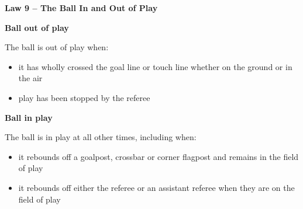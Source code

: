 \clearpage
\sffamily
{\bfseries\color[rgb]{0.4,0.4,0.4}
Law 9 -- The Ball In and Out of Play}
{}

\bigskip

{\bfseries Ball out of play}

\headlinebox

The ball is out of play when:

\begin{itemize}
\item it has wholly crossed the goal line or touch line whether on the ground or in the air
\item play has been stopped by the referee
\end{itemize}

{\bfseries Ball in play }

\headlinebox

The ball is in play at all other times, including when:

\begin{itemize}
\item it rebounds off a goalpost, crossbar or corner flagpost and remains in the field of play
\item it rebounds off either the referee or an assistant referee when they are on the field of play
\end{itemize}